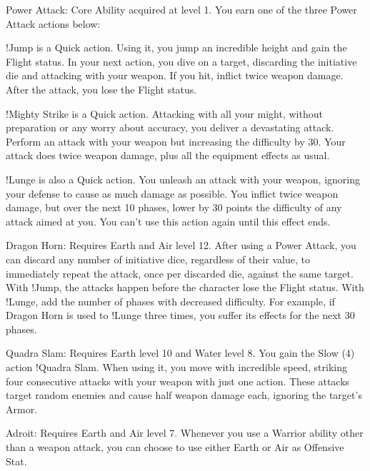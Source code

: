 \begin{ffminipage}
  Power Attack: Core Ability acquired at level 1. You earn one of the three Power Attack actions below:

  \begin{jobchoice}[header=false]
    !Jump is a Quick action. Using it, you jump an incredible height and gain the Flight status. In your next action, you dive on a target, discarding the initiative die and attacking with your weapon. If you hit, inflict twice weapon damage. After the attack, you lose the Flight status.

    !Mighty Strike is a Quick action. Attacking with all your might, without preparation or any worry about accuracy, you deliver a devastating attack. Perform an attack with your weapon but increasing the difficulty by 30. Your attack does twice weapon damage, plus all the equipment effects as usual.

    !Lunge is also a Quick action. You unleash an attack with your weapon, ignoring your defense to cause as much damage as possible. You inflict twice weapon damage, but over the next 10 phases, lower by 30 points the difficulty of any attack aimed at you. You can’t use this action again until this effect ends.
  \end{jobchoice}

  \begin{jobchoice}
    Dragon Horn: Requires Earth and Air level 12. After using a Power Attack, you can discard any number of initiative dice, regardless of their value, to immediately repeat the attack, once per discarded die, against the same target. With !Jump, the attacks happen before the character lose the Flight status. With !Lunge, add the number of phases with decreased difficulty. For example, if Dragon Horn is used to !Lunge three times, you suffer its effects for the next 30 phases.

    Quadra Slam: Requires Earth level 10 and Water level 8. You gain the Slow (4) action !Quadra Slam. When using it, you move with incredible speed, striking four consecutive attacks with your weapon with just one action. These attacks target random enemies and cause half weapon damage each, ignoring the target’s Armor.

    Adroit: Requires Earth and Air level 7. Whenever you use a Warrior ability other than a weapon attack, you can choose to use either Earth or Air as Offensive Stat.
  \end{jobchoice}
\end{ffminipage}

